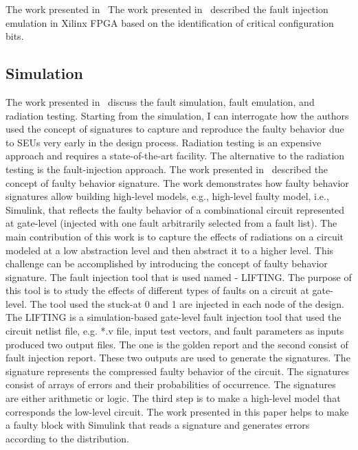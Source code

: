  The work presented in~\cite{hobeika2014multi}  The work presented in~\cite{souari2015optimization} described the fault injection emulation in Xilinx FPGA based on the identification of critical configuration bits. 






\subsection{Simulation}

The work presented in~\cite{robache2013methodology} discuss the fault simulation, fault emulation, and radiation testing. Starting from the simulation, I can interrogate how the authors used the concept of signatures to capture and reproduce the faulty behavior due to SEUs very early in the design process.
Radiation testing is an expensive approach and requires a state-of-the-art facility. The alternative to the radiation testing is the fault-injection approach.  The work presented in~\cite{hobeika2014multi} described the concept of faulty behavior signature. The work demonstrates how faulty behavior signatures allow building high-level models, e.g., high-level faulty model, i.e., Simulink, that reflects the faulty behavior of a combinational circuit represented at gate-level  (injected with one fault arbitrarily selected from a fault list). The main contribution of this work is to capture the effects of radiations on a circuit modeled at a low abstraction level and then abstract it to a  higher level. This challenge can be accomplished by introducing the concept of faulty behavior signature.  The fault injection tool that is used named - LIFTING.  The purpose of this tool is to study the effects of different types of faults on a circuit at gate-level. The tool used the stuck-at 0 and 1 are injected in each node of the design. The LIFTING is a simulation-based gate-level fault injection tool that used the circuit netlist file, e.g.  *.v file, input test vectors, and fault parameters as inputs produced two output files. The one is the golden report and the second consist of fault injection report. These two outputs are used to generate the signatures.  The signature represents the compressed faulty behavior of the circuit. The signatures consist of arrays of errors and their probabilities of occurrence. The signatures are either arithmetic or logic.  The third step is to make a high-level model that corresponds the low-level circuit. The work presented in this paper helps to make a faulty block with Simulink that reads a signature and generates errors according to the distribution.

